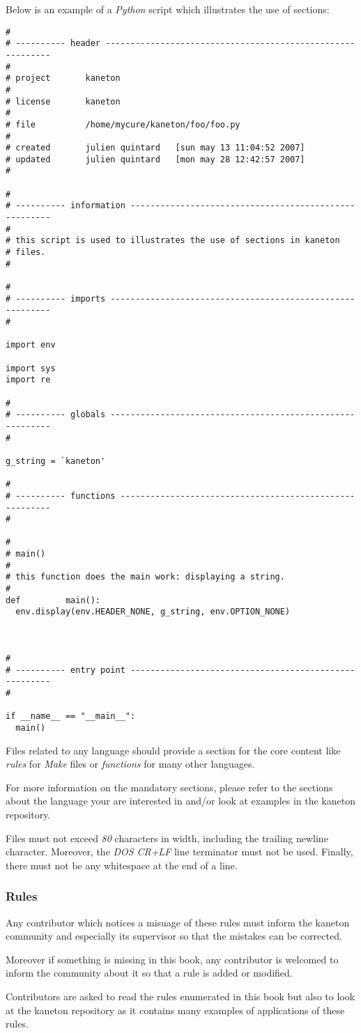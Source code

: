 Below is an example of a \textit{Python} script which illustrates the
use of sections:

\begin{verbatim}
#
# ---------- header -----------------------------------------------------------
#
# project       kaneton
#
# license       kaneton
#
# file          /home/mycure/kaneton/foo/foo.py
#
# created       julien quintard   [sun may 13 11:04:52 2007]
# updated       julien quintard   [mon may 28 12:42:57 2007]
#

#
# ---------- information ------------------------------------------------------
#
# this script is used to illustrates the use of sections in kaneton
# files.
#

#
# ---------- imports ----------------------------------------------------------
#

import env

import sys
import re

#
# ---------- globals ----------------------------------------------------------
#

g_string = `kaneton'

#
# ---------- functions --------------------------------------------------------
#

#
# main()
#
# this function does the main work: displaying a string.
#
def			main():
  env.display(env.HEADER_NONE, g_string, env.OPTION_NONE)



#
# ---------- entry point ------------------------------------------------------
#

if __name__ == "__main__":
  main()

\end{verbatim}

Files related to any language should provide a section for the core
content like \textit{rules} for \textit{Make} files or \textit{functions}
for many other languages.

For more information on the mandatory sections, please refer to
the sections about the language your are interested in and/or look at
examples in the kaneton repository.

Files must not exceed \textit{80} characters in width, including
the trailing newline character. Moreover, the \textit{DOS} \textit{CR+LF}
line terminator must not be used. Finally, there must not be any whitespace
at the end of a line.


\subsubsection{Rules}

Any contributor which notices a misuage of these rules must inform the
kaneton community and especially its supervisor so that the mistakes can be
corrected.

Moreover if something is missing in this book, any contributor is welcomed
to inform the community about it so that a rule is added or modified.

Contributors are asked to read the rules enumerated in this book but also
to look at the kaneton repository as it contains many examples of applications
of these rules.
